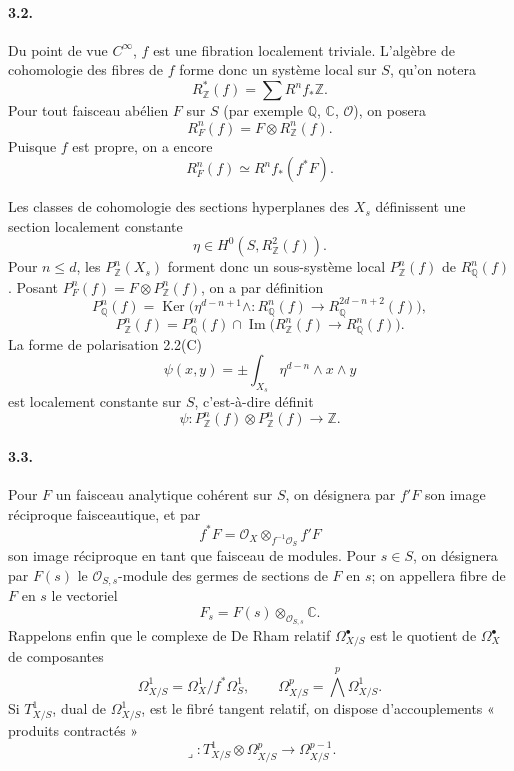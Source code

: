 \documentclass[10pt]{article}
\newcommand{\C}{\mathbb C}
\newcommand{\Z}{\mathbb Z}
\newcommand{\Q}{\mathbb Q}
\newcommand{\cO}{\mathcal O}
\newcommand{\Ker}{\operatorname{Ker}}
\newcommand{\Imop}{\operatorname{Im}}
\theoremstyle{deligne}
\begin{document}
\paragraph{3.2.}
Du point de vue $C^\infty$, $f$ est une fibration localement triviale. L'algèbre de cohomologie des fibres de $f$ forme donc un système local sur $S$, qu'on notera
\[
R_\Z^*(f)=\sum R^n f_*\Z .
\]
Pour tout faisceau abélien $F$ sur $S$ (par exemple $\Q$, $\C$, $\cO$), on posera
\begin{equation}
R_F^n(f)=F\otimes R_\Z^n(f).
\tag{3.2.1}
\end{equation}
Puisque $f$ est propre, on a encore
\[
R_F^n(f)\simeq R^n f_*(f^*F).
\]

Les classes de cohomologie des sections hyperplanes des $X_s$ définissent une section localement constante
\begin{equation}
\eta\in H^0(S,R_\Z^2(f)).
\tag{3.2.2}
\end{equation}
Pour $n\le d$, les $P_\Z^n(X_s)$ forment donc un sous-système local $P_\Z^n(f)$ de $R_\Q^n(f)$. Posant $P_F^n(f)=F\otimes P_\Z^n(f)$, on a par définition
\begin{equation}
P_\Q^n(f)=\Ker\bigl(\eta^{d-n+1}\wedge:R_\Q^n(f)\to R_\Q^{2d-n+2}(f)\bigr),
\tag{3.2.3}
\end{equation}
\begin{equation}
P_\Z^n(f)=P_\Q^n(f)\cap \Imop\bigl(R_\Z^n(f)\to R_\Q^n(f)\bigr).
\tag{3.2.4}
\end{equation}
La forme de polarisation 2.2(C)
\begin{equation}
\psi(x,y)=\pm\int_{X_s}\eta^{d-n}\wedge x\wedge y
\tag{3.2.5}
\end{equation}
est localement constante sur $S$, c'est-à-dire définit
\begin{equation}
\psi:P_\Z^n(f)\otimes P_\Z^n(f)\longrightarrow \Z .
\tag{3.2.6}
\end{equation}

\paragraph{3.3.}
Pour $F$ un faisceau analytique cohérent sur $S$, on désignera par $f'F$ son image réciproque faisceautique, et par
\[
f^*F=\cO_X\otimes_{f^{-1}\cO_S}f'F
\]
son image réciproque en tant que faisceau de modules. Pour $s\in S$, on désignera par $F(s)$ le $\cO_{S,s}$-module des germes de sections de $F$ en $s$; on appellera fibre de $F$ en $s$ le vectoriel
\[
F_s=F(s)\otimes_{\cO_{S,s}}\C .
\]
Rappelons enfin que le complexe de De Rham relatif $\Omega_{X/S}^\bullet$ est le quotient de $\Omega_X^\bullet$ de composantes
\[
\Omega^1_{X/S}=\Omega_X^1/f^*\Omega_S^1,
\qquad
\Omega^p_{X/S}=\bigwedge^p\Omega_{X/S}^1 .
\]
Si $T^1_{X/S}$, dual de $\Omega^1_{X/S}$, est le fibré tangent relatif, on dispose d'accouplements « produits contractés »
\begin{equation}
\lrcorner:T^1_{X/S}\otimes\Omega^p_{X/S}\longrightarrow\Omega^{p-1}_{X/S}.
\tag{3.3.1}
\end{equation}
\end{document}
